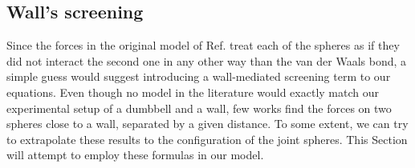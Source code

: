 \documentclass{master_thesis}
\begin{document}
\subsection{Wall's screening} \label{sec:screening}

Since the forces in the original model of Ref. \cite{verweij2021} treat each of the spheres as if they did not interact the second one in any other way than the van der Waals bond, a simple guess would suggest introducing a wall-mediated screening term to our equations. Even though no model in the literature would exactly match our experimental setup of a dumbbell and a wall, few works find the forces on two spheres close to a wall, separated by a given distance. To some extent, we can try to extrapolate these results to the configuration of the joint spheres. This Section will attempt to employ these formulas in our model.
\end{document}
